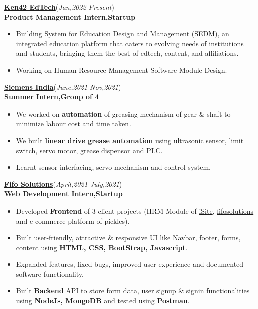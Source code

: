 \documentclass[10pt]{extarticle}
\begin{document}
\vspace{1pt}
\href{https://www.ken42.com/}{\textbf{Ken42 EdTech}}\hfill\hfill(\textit{Jan,2022-Present})\\
\textbf{Product Management Intern,Startup}
    \begin{itemize}
       \item Building System for Education Design and Management (SEDM), an integrated education platform that caters to evolving needs of institutions and students, bringing them the best of edtech, content, and affiliations. 
       \item Working on Human Resource Management Software Module Design.
    \end{itemize}
\vspace{5pt}
\href{https://github.com/PSoni8/Siemens-2021-2022-Internship}{\textbf{Siemens India}}\hfill\hfill(\textit{June,2021-Nov,2021})\\
\textbf{Summer Intern,Group of 4}
     \begin{itemize}
         \item We worked on \textbf{automation} of greasing mechanism of gear \& shaft to minimize labour cost and time taken.
         \item We built \textbf{linear drive grease automation} using ultrasonic sensor, limit switch, servo motor, grease dispensor and PLC. 
         \item Learnt sensor interfacing, servo mechanism and control system.
     \end{itemize}
\vspace{5pt}
\href{https://github.com/PSoni8/FIFO-Solutions-Internship}{\textbf{Fifo Solutions}}\hfill\hfill(\textit{April,2021-July,2021})\\
\textbf{Web Development Intern,Startup}
    \begin{itemize}
        \item Developed \textbf{Frontend} of 3 client projects (HRM Module of \href{https://isiteinfo.com/}{iSite}, \href{https://www.fifosolutions.com/}{fifosolutions} and e-commerce platform of pickles).
        \item Built user-friendly, attractive \& responsive UI like Navbar, footer, forms, content using \textbf{HTML, CSS, BootStrap, Javascript}.
        \item Expanded features, fixed bugs, improved user experience and documented software functionality.
        \item Built \textbf{Backend} API to store form data, user signup \& signin functionalities using \textbf{NodeJs, MongoDB} and tested using \textbf{Postman}.
    \end{itemize}
\end{document}
